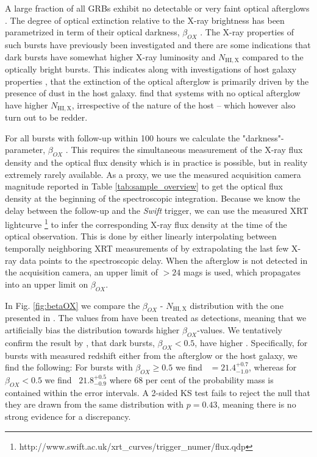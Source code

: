 \documentclass{aa}    %
\begin{document}
A large fraction of all GRBs exhibit no detectable or very faint optical
afterglows \citep{Groot1998, Djorgovski2001, Fynbo2001}. The degree of optical
extinction relative to the X-ray brightness has been parametrized in term of
their optical darkness, $\beta_{OX}$ \citep{Jakobsson2004, Rol2005,
	VanderHorst2009}. The X-ray properties of such bursts have previously been
investigated \citep{DePasquale2003, Fynbo2009, Melandri2012} and there are some
indications that dark bursts have somewhat higher X-ray luminosity and
$N_{\mathrm{HI, X}}$ compared to the optically bright bursts. This indicates
along with investigations of host galaxy properties \citep{Greiner2011,
	Kruhler2011, Hjorth2012, Perley2016b}, that the extinction of the optical
afterglow is primarily driven by the presence of dust in the host galaxy.
\citet{Hjorth2012} find that systems with no optical afterglow have higher
$N_{\mathrm{HI, X}}$, irrespective of the nature of the host -- which however
also turn out to be redder.

For all bursts with follow-up within 100 hours we calculate the
"darkness"-parameter, $\beta_{OX}$ \citep{Jakobsson2004}. This requires the
simultaneous measurement of the X-ray flux density and the optical flux density
which is in practice is possible, but in reality extremely rarely available. As
a proxy, we use the measured acquisition camera magnitude reported in Table
\ref{tab:sample_overview} to get the optical flux density at the beginning of
the spectroscopic integration. Because we know the delay between the follow-up
and the \textit{Swift} trigger, we can use the measured XRT lightcurve
\citep{Evans2007,
	Evans2009}\footnote{http://www.swift.ac.uk/xrt\_curves/trigger\_numer/flux.qdp}
to infer the corresponding X-ray flux density at the time of the optical
observation. This is done by either linearly interpolating between temporally
neighboring XRT measurements of by extrapolating the last few X-ray data points
to the spectroscopic delay. When the afterglow is not detected in the
acquisition camera, an upper limit of $> 24$ mags is used, which propagates into
an upper limit on $\beta_{OX}$.

In Fig. \ref{fig:betaOX} we compare the $\beta_{OX}$ - $N_{\mathrm{HI, X}}$
distribution with the one presented in \citet{Fynbo2009}. The values from
\citet{Fynbo2009} have been treated as detections, meaning that we artificially
bias the distribution towards higher $\beta_{OX}$-values. We tentatively confirm
the result by \citet{Fynbo2009}, that dark bursts, $\beta_{OX} < 0.5$, have
higher \nhx. Specifically, for bursts with measured redshift either from the
afterglow or the host galaxy, we find the following: For bursts with $\beta_{OX}
\geq 0.5$ we find \nhx~$ = 21.4_{-1.0}^{+0.7}$, whereas for $\beta_{OX} < 0.5$
we find \nhx~$21.8_{-0.9}^{+0.5}$ where 68 per cent of the probability mass is
contained within the error intervals. A 2-sided KS test fails to reject the null
that they are drawn from the same distribution with $p = 0.43$, meaning there is
no strong evidence for a discrepancy.
\end{document}
